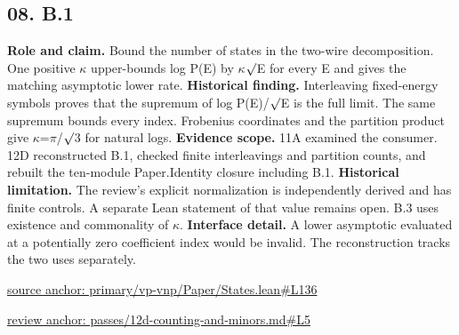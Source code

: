 \documentclass[11pt,letterpaper]{article}
\theoremstyle{definition}\newtheorem{definition}[theorem]{Definition}\newtheorem{example}[theorem]{Example}
\theoremstyle{remark}\newtheorem{remark}[theorem]{Remark}
\begin{document}
\subsection*{08. B.1}
\textbf{Role and claim.} Bound the number of states in the two-wire decomposition. One positive \ensuremath{\kappa} upper-bounds log P(E) by \ensuremath{\kappa}\ensuremath{\sqrt{\vphantom{x}}}E for every E and gives the matching asymptotic lower rate.
\textbf{Historical finding.} Interleaving fixed-energy symbols proves that the supremum of log P(E)/\ensuremath{\sqrt{\vphantom{x}}}E is the full limit. The same supremum bounds every index. Frobenius coordinates and the partition product give \ensuremath{\kappa}=\ensuremath{\pi}/\ensuremath{\sqrt{\vphantom{x}}}3 for natural logs.
\textbf{Evidence scope.} 11A examined the consumer. 12D reconstructed B.1, checked finite interleavings and partition counts, and rebuilt the ten-module Paper.Identity closure including B.1.
\textbf{Historical limitation.} The review's explicit normalization is independently derived and has finite controls. A separate Lean statement of that value remains open. B.3 uses existence and commonality of \ensuremath{\kappa}.
\textbf{Interface detail.} A lower asymptotic evaluated at a potentially zero coefficient index would be invalid. The reconstruction tracks the two uses separately.
\par\href{https://github.com/nousentllc/VP-VNP-Review/blob/8a7976933b6b2b4ffda1ad3a0dfb5fc6b6f023e8/primary/vp-vnp/Paper/States.lean\#L136}{source anchor: primary/vp-vnp/Paper/States.lean\#L136}
\par\href{https://github.com/nousentllc/VP-VNP-Review/blob/8a7976933b6b2b4ffda1ad3a0dfb5fc6b6f023e8/passes/12d-counting-and-minors.md\#L5}{review anchor: passes/12d-counting-and-minors.md\#L5}
\goodbreak
{}
\hypertarget{claim.09}{}
\end{document}
